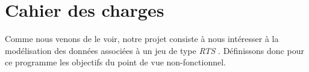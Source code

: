 \chapter{Cahier des charges}
\minitoc

Comme nous venons de le voir, notre projet consiste à nous intéresser à la modélisation des données associées à un jeu de type \emph{RTS} . Définissons donc pour ce programme les objectifs du point de vue non-fonctionnel.


